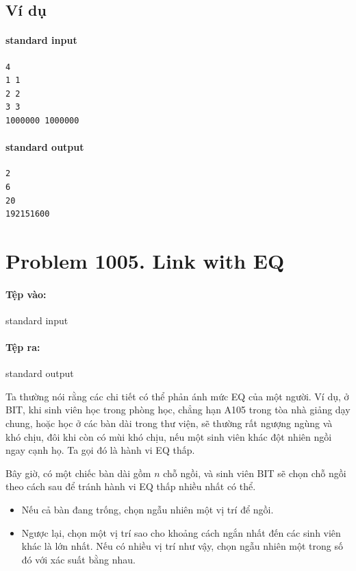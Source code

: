\documentclass[11pt]{article}
\begin{document}
\subsection*{Ví dụ}

\paragraph{standard input}
\begin{verbatim}
4
1 1
2 2
3 3
1000000 1000000
\end{verbatim}

\paragraph{standard output}
\begin{verbatim}
2
6
20
192151600
\end{verbatim}

\section{Problem 1005. Link with EQ}

\paragraph{Tệp vào:} standard input
\paragraph{Tệp ra:} standard output

Ta thường nói rằng các chi tiết có thể phản ánh mức EQ của một người. Ví dụ,
ở BIT, khi sinh viên học trong phòng học, chẳng hạn A105 trong tòa nhà giảng
dạy chung, hoặc học ở các bàn dài trong thư viện, sẽ thường rất ngượng ngùng
và khó chịu, đôi khi còn có mùi khó chịu, nếu một sinh viên khác đột nhiên
ngồi ngay cạnh họ. Ta gọi đó là hành vi EQ thấp.

Bây giờ, có một chiếc bàn dài gồm \(n\) chỗ ngồi, và sinh viên BIT sẽ chọn chỗ
ngồi theo cách sau để tránh hành vi EQ thấp nhiều nhất có thể.

\begin{itemize}
  \item Nếu cả bàn đang trống, chọn ngẫu nhiên một vị trí để ngồi.
  \item Ngược lại, chọn một vị trí sao cho khoảng cách ngắn nhất đến các sinh
  viên khác là lớn nhất. Nếu có nhiều vị trí như vậy, chọn ngẫu nhiên một
  trong số đó với xác suất bằng nhau.
\end{itemize}
\end{document}
